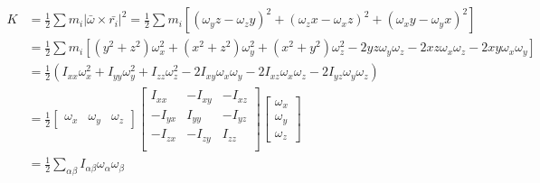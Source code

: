 \documentclass{article}
\begin{document}
\section{}

\begin{align*}
K&=\frac{1}{2}\sum m_i|\bar{\omega}\times\bar{r_i}|^2=\frac{1}{2}\sum m_i[(\omega_yz-\omega_zy)^2+(\omega_zx-\omega_xz)^2+(\omega_xy-\omega_yx)^2]\\
&=\frac{1}{2}\sum m_i[(y^2+z^2)\omega_x^2+(x^2+z^2)\omega_y^2+(x^2+y^2)\omega_z^2-2yz\omega_y\omega_z-2xz\omega_x\omega_z-2xy\omega_x\omega_y]\\
&=\frac{1}{2}(I_{xx}\omega_x^2+I_{yy}\omega_y^2+I_{zz}\omega_z^2-2I_{xy}\omega_x\omega_y-2I_{xz}\omega_x\omega_z-2I_{yz}\omega_y\omega_z)\\
&=\frac{1}{2}
\begin{bmatrix}
	\omega_x&\omega_y&\omega_z
\end{bmatrix}
\begin{bmatrix}
	 I_{xx} & -I_{xy} & -I_{xz}\\
	-I_{yx} &  I_{yy} & -I_{yz}\\
	-I_{zx} & -I_{zy} &  I_{zz}\\
\end{bmatrix}
\begin{bmatrix}
	\omega_x\\ \omega_y\\ \omega_z
\end{bmatrix}
\\
&=\frac{1}{2}\sum_{\alpha\beta}I_{\alpha\beta}\omega_\alpha\omega_\beta
\end{align*}
\end{document}
